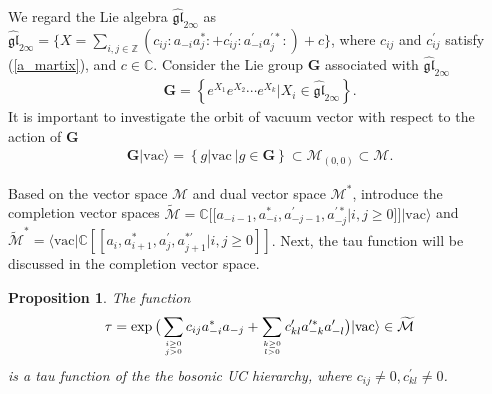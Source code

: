 \documentclass[10pt,a4paper]{amsart}
\numberwithin{equation}{section}
\newtheorem{proposition}[theorem]{Proposition}
\begin{document}
We regard the Lie algebra $\mathfrak{\widehat{gl}}_{2\infty}$ as $\mathfrak{\widehat{gl}}_{2\infty}=\big\{X=\sum\limits_{i,j\in\mathbb{Z}}(
c_{ij}:a_{-i}a^{\ast}_{j}:+c^{\prime}_{ij}:a^{\prime}_{-i}a^{\prime\ast}_{j}:)
+c\big\}$, where $c_{ij}$ and $c^{\prime}_{ij}$ satisfy (\ref{a_martix}), and $c\in\mathbb{C}$. Consider the Lie group $\mathbf{G}$ associated with $\mathfrak{\widehat{gl}}_{2\infty}$
\begin{eqnarray}
\mathbf{G}=\left\{e^{X_{1}}e^{X_{2}}\cdots e^{X_{k}}|X_{i}\in\mathfrak{\widehat{gl}}_{2\infty}\right\}.
\end{eqnarray}
It is important to investigate the orbit of vacuum vector with respect to the action of  $\mathbf{G}$
\begin{eqnarray}
\mathbf{G}|\text{vac}\rangle=\left\{g|\text{vac}\ | g\in\mathbf{G} \right\}\subset \mathcal{M}_{(0,0)}\subset\mathcal{M}.
\end{eqnarray}

Based on the vector space $\mathcal{M}$ and dual vector space $\mathcal{M}^{\ast}$, introduce the completion vector spaces $\mathcal{\widetilde{M}}=\mathbb{C}[[a_{-i-1},a^{\ast}_{-i},a^{\prime}_{-j-1},
a^{\prime\ast}_{-j}|i,j\geq0]]|\text{vac}\rangle$ and $\mathcal{\widetilde{M}}^{\ast}=\langle\text{vac}|\mathbb{C}[[a_{i},a^{\ast}_{i+1},
a^{\prime}_{j},a^{\ast\prime}_{j+1}|i,j\geq0]]$. Next, the tau function will be discussed in  the completion vector space.






\begin{proposition}
The function
\begin{eqnarray}\label{tau_com}
\tau=\exp\big(\sum\limits_{i\geq0\atop{j>0}}c_{ij}a^{\ast}_{-i}a_{-j}+
\sum\limits_{k\geq0\atop{l>0}}c^{\prime}_{kl}a^{\prime\ast}_{-k}a^{\prime}_{-l}\big)
|\text{vac}\rangle \in \mathcal{\widetilde{M}}
\end{eqnarray}
is a tau function of the the bosonic UC hierarchy, where $c_{ij}\neq0, c^{\prime}_{kl}\neq0$.
\end{proposition}
\end{document}
